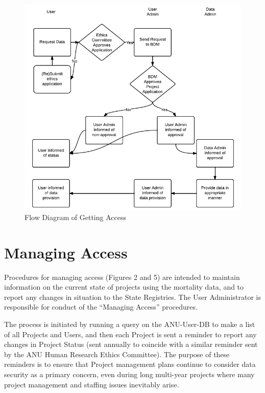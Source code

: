 \documentclass[a4paper]{article}
\begin{document}
\begin{figure}[!h]
\centering
\includegraphics[width=1\textwidth]{DataAccessFlowDiagram-GettingAccess-general.png}
\caption{Flow Diagram of Getting Access}
\label{fig:DataAccessFlowDiagram-GettingAccess}
\end{figure}
\clearpage
\section{Managing Access}
\label{sec-3}

Procedures for managing access (Figures 2 and 5) are intended to maintain information on the current state of projects using the mortality data, and to report any changes in situation to the State Registries. The User Administrator is responsible for conduct of the ``Managing Access'' procedures.

The process is initiated by running a query on the ANU-User-DB to make a list of all Projects and Users, and then each Project is sent a reminder to report any changes in Project Status (sent annually to coincide with a similar reminder sent by the ANU Human Research Ethics Committee). The purpose of these reminders is to ensure that Project management plans continue to consider data security as a primary concern, even during long multi-year projects where many project management and staffing issues inevitably arise.
\end{document}
